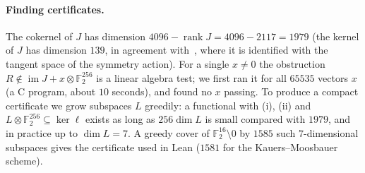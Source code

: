 \documentclass[11pt]{article}
\numberwithin{equation}{section}
\theoremstyle{definition}
\theoremstyle{remark}
\newcommand{\F}{\mathbb F}
\newcommand{\im}{\operatorname{im}}
\begin{document}
\paragraph{Finding certificates.} The cokernel of $J$ has dimension $4096-\operatorname{rank}J=4096-2117=1979$
(the kernel of $J$ has dimension $139$, in agreement with~\cite{cloudroom}, where it is identified with the
tangent space of the symmetry action). For a single $x\ne0$ the obstruction $R\notin\im J+x\otimes\F_2^{256}$ is a linear
algebra test; we first ran it for all $65535$ vectors $x$ (a C program, about $10$ seconds), and found no
$x$ passing. To produce a compact certificate we grow subspaces $L$ greedily: a functional with
(i), (ii) and $L\otimes\F_2^{256}\subseteq\ker\ell$ exists as long as $256\dim L$ is small compared with $1979$,
and in practice up to $\dim L=7$. A greedy cover of $\F_2^{16}\setminus0$ by $1585$ such $7$-dimensional
subspaces gives the certificate used in Lean ($1581$ for the Kauers--Moosbauer scheme).
\end{document}
